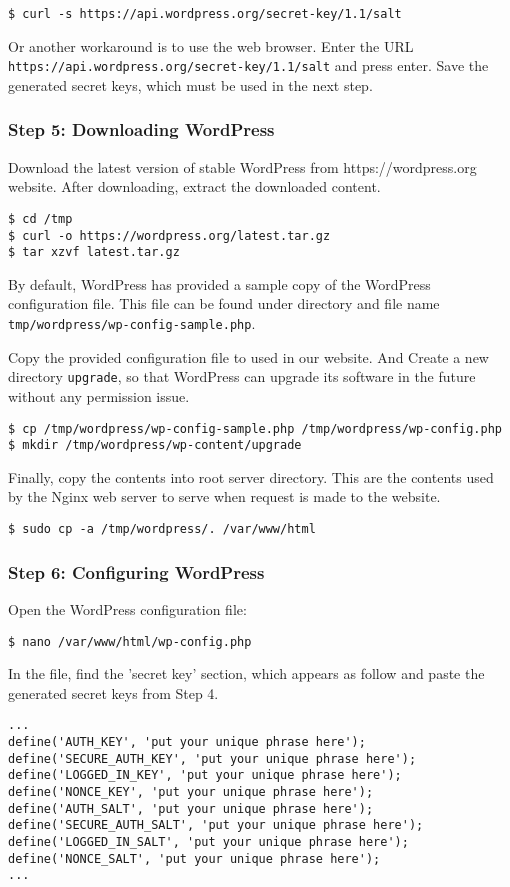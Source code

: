 \begin{lstlisting}
$ curl -s https://api.wordpress.org/secret-key/1.1/salt
\end{lstlisting}

Or another workaround is to use the web browser. Enter the URL \texttt{https://api.wordpress.org/secret-key/1.1/salt} and press enter. Save the generated secret keys, which must be used in the next step.


\subsubsection*{Step 5: Downloading WordPress}
Download the latest version of stable WordPress from https://wordpress.org website. After downloading, extract the downloaded content.

\begin{lstlisting}
$ cd /tmp
$ curl -o https://wordpress.org/latest.tar.gz
$ tar xzvf latest.tar.gz
\end{lstlisting}

By default, WordPress has provided a sample copy of the WordPress configuration file. This file can be found under directory and file name \texttt{tmp/wordpress/wp-config-sample.php}.

Copy the provided configuration file to used in our website. And Create a new directory \texttt{upgrade}, so that WordPress can upgrade its software in the future without any permission issue.
\begin{lstlisting}
$ cp /tmp/wordpress/wp-config-sample.php /tmp/wordpress/wp-config.php
$ mkdir /tmp/wordpress/wp-content/upgrade
\end{lstlisting}

Finally, copy the contents into root server directory. This are the contents used by the Nginx web server to serve when request is made to the website.
\begin{lstlisting}
$ sudo cp -a /tmp/wordpress/. /var/www/html
\end{lstlisting}

\subsubsection*{Step 6: Configuring WordPress}
Open the WordPress configuration file:
\begin{lstlisting}
$ nano /var/www/html/wp-config.php
\end{lstlisting}

In the file, find the 'secret key' section, which appears as follow and paste the generated secret keys from Step 4.
\begin{lstlisting}
...
define('AUTH_KEY', 'put your unique phrase here');
define('SECURE_AUTH_KEY', 'put your unique phrase here');
define('LOGGED_IN_KEY', 'put your unique phrase here');
define('NONCE_KEY', 'put your unique phrase here');
define('AUTH_SALT', 'put your unique phrase here');
define('SECURE_AUTH_SALT', 'put your unique phrase here');
define('LOGGED_IN_SALT', 'put your unique phrase here');
define('NONCE_SALT', 'put your unique phrase here');
...
\end{lstlisting}


